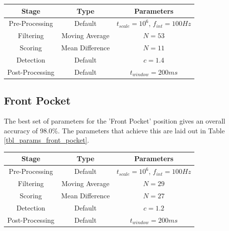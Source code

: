                 \begin{center}
                    \label{tbl_params_in_hand}
                    \begin{tabular}{|c|c|c|}
                        \hline
                        Stage & Type & Parameters \\
                        \hline
                        Pre-Processing & Default & $t_{scale}=10^6$, $f_{int}=100Hz$ \\
                        Filtering & Moving Average & $N=53$ \\
                        Scoring & Mean Difference & $N=11$ \\
                        Detection & Default & $c=1.4$ \\
                        Post-Processing & Default & $t_{window}=200ms$ \\
                        \hline
                    \end{tabular}
                \end{center}

            \subsection{Front Pocket}

                The best set of parameters for the 'Front Pocket' position gives an overall accuracy of 98.0\%. The parameters that achieve this are laid out in Table \ref{tbl_params_front_pocket}.

                \begin{center}
                    \label{tbl_params_front_pocket}
                    \begin{tabular}{|c|c|c|}
                        \hline
                        Stage & Type & Parameters \\
                        \hline
                        Pre-Processing & Default & $t_{scale}=10^6$, $f_{int}=100Hz$ \\
                        Filtering & Moving Average & $N=29$ \\
                        Scoring & Mean Difference & $N=27$ \\
                        Detection & Default & $c=1.2$ \\
                        Post-Processing & Default & $t_{window}=200ms$ \\
                        \hline
                    \end{tabular}
                \end{center}  


